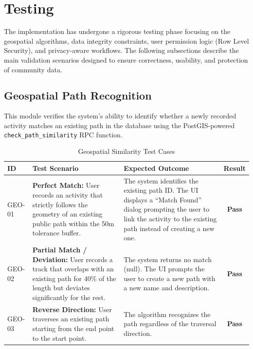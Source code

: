 \section{Testing}

The implementation has undergone a rigorous testing phase focusing on the geospatial algorithms, data integrity constraints, user permission logic (Row Level Security), and privacy-aware workflows.  
The following subsections describe the main validation scenarios designed to ensure correctness, usability, and protection of community data.

\subsection{Geospatial Path Recognition}

This module verifies the system's ability to identify whether a newly recorded activity matches an existing path in the database using the PostGIS-powered \texttt{check\_path\_similarity} RPC function.

\begin{table}[H]
\centering
\renewcommand{\arraystretch}{1.5}
\begin{tabular}{|l|p{6cm}|p{6cm}|c|}
\hline
\textbf{ID} & \textbf{Test Scenario} & \textbf{Expected Outcome} & \textbf{Result} \\
\hline
GEO-01 & \textbf{Perfect Match:} User records an activity that strictly follows the geometry of an existing public path within the 50m tolerance buffer. & The system identifies the existing path ID. The UI displays a ``Match Found'' dialog prompting the user to link the activity to the existing path instead of creating a new one. & \textbf{Pass} \\
\hline
GEO-02 & \textbf{Partial Match / Deviation:} User records a track that overlaps with an existing path for 40\% of the length but deviates significantly for the rest. & The system returns no match (null). The UI prompts the user to create a new path with a new name and description. & \textbf{Pass} \\
\hline
GEO-03 & \textbf{Reverse Direction:} User traverses an existing path starting from the end point to the start point. & The algorithm recognizes the path regardless of the traversal direction. & \textbf{Pass} \\
\hline
\end{tabular}
\caption{Geospatial Similarity Test Cases}
\label{tab:geo_tests}
\end{table}

